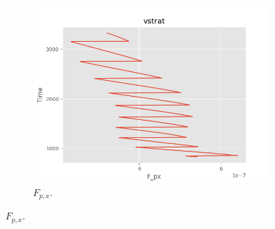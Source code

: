 \documentclass[dvipsnames, 10pt]{beamer}
\begin{document}
\begin{frame}
\begin{figure}[t]
\begin{subfigure}{0.53\textwidth}
            \includegraphics[width=\textwidth]{fluxes_vstrat.png}
            \caption{$F_{p, x}$.}
        \end{subfigure}
        \hspace*{-19mm}%
    \end{figure}
\end{frame}
\end{document}
